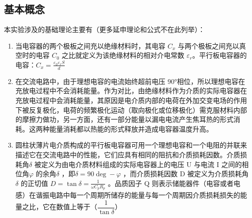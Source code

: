 \documentclass[a4paper,utf8]{article}
\begin{document}
    \subsection{基本概念}
        本实验涉及的基础理论主要有（更多延申理论和公式不在此列举）：
        \begin{enumerate}
            \item 当电容器的两个极板之间充以绝缘材料时，其电容 $C_x$ 与两个极板之间充以真空时的电容 $C_0$ 之比就定义为该绝缘材料的相对介电常数 $\varepsilon_r$。平行板电容器的电容：$C_x=\frac{\varepsilon_0 \varepsilon_r S}{d}$
            \item 在交流电路中，由于理想电容的电流始终超前电压 90°相位，所以理想电容在充放电过程中不会消耗能量。作为对比，由绝缘材料作为介质的实际电容器在充放电过程中会消耗能量，其原因是电介质内部的电荷在外加交变电场的作用下被反复极化，电荷的频繁极化运动（取向极化或位移极化）需克服材料内部的摩擦力做功，另一方面，还有一部分能量以漏电电流产生焦耳热的形式消耗。这两种能量消耗都以热能的形式释放并造成电容器温度升高。
            \item 圆柱状薄片电介质构成的平行板电容器可用一个理想电容和一个电阻的并联来描述它在交流电路中的性能，它们应具有相同的阻抗和介质损耗因数。介质损耗角$\delta$ 被定义为由电介质材料组成的实际电容器上的电压 U 与电流 I 之间的相位角$\varphi$ 的余角$\delta$ ，即$\delta  = 90\deg - \varphi$ ，而介质损耗因数 D 被定义为介质损耗角$\delta$ 的正切值 $D=\tan\delta=\frac{1}{\omega C_{p}R_{p}}$ 。品质因子 Q 则表示储能器件（电容或者电感）在谐振电路中每一个周期所储存的能量与每一个周期因介质损耗损失的能量之比，它在数值上等于（$\dfrac{1}{\tan\delta}$）
        \end{enumerate}
        
\end{document}
